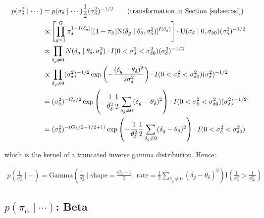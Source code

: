 \documentclass{article}\usepackage{graphicx, color}
\begin{document}
\begin{flushleft}
\begin{align*}
p(\sigma_\delta^2 \mid \cdots ) & = p(\sigma_\delta \mid \cdots) \frac{1}{2} (\sigma_\delta^2)^{-1/2} \qquad \text{(transformation in Section \ref{subsec:sd})} \\
&\propto \left [ \prod_{g = 1}^G  \pi_\delta^{1-I(\delta_g)}[(1- \pi_\delta)\text{N}(\delta_g \mid \theta_\delta, \sigma_\delta^2)]^{I(\delta_g)} \right ]  \cdot \text{U}(\sigma_\delta \mid 0, \sigma_{\delta 0})  (\sigma_\delta^2)^{-1/2} \\
&\propto \prod_{\delta_g \ne 0} N(\delta_g \mid \theta_\delta, \sigma_\delta^2) \cdot I(0 < \sigma_\delta^2 < \sigma_{\delta 0}^2 )  (\sigma_\delta^2)^{-1/2} \\
&\propto \prod_{\delta_g \ne 0} (\sigma_\delta^2)^{-1/2} \exp \left ( -\frac{(\delta_g - \theta_\delta)^2}{2 \sigma_\delta^2}\right ) \cdot I(0 < \sigma_\delta^2 < \sigma_{\delta 0}^2 )  (\sigma_\delta^2)^{-1/2} \\
&= (\sigma_\delta^2)^{-G_\delta/2} \exp \left ( -\frac{1}{\theta_\delta^2} \frac{1}{2} \sum_{\delta_g \ne 0} (\delta_g - \theta_\delta)^2 \right ) \cdot I(0 < \sigma_\delta^2 < \sigma_{\delta 0}^2 )  (\sigma_\delta^2)^{-1/2} \\
&= (\sigma_\delta^2)^{-(G_\delta/2 -1 /2 + 1)} \exp \left ( -\frac{1}{\theta_\delta^2} \frac{1}{2} \sum_{\delta_g \ne 0} (\delta_g - \theta_\delta)^2 \right ) \cdot I(0 < \sigma_\delta^2 < \sigma_{\delta 0}^2 ) \\
\end{align*}

which is the kernel of a truncated inverse gamma distribution. Hence:

\begin{align*}
p\left ( \frac{1}{\sigma_\delta^2} \mid \cdots \right ) = \text{Gamma} \left (\frac{1}{\sigma_\delta^2} \mid \text{shape} = \frac{G_\delta - 1}{2}, \ \text{rate} = \frac{1}{2} \sum_{\delta_g \ne 0} (\delta_g - \theta_\delta)^2 \right )  \text{I} \left (\frac{1}{\sigma_\delta^2} >\frac{1}{ \sigma_{\delta 0}^2} \right )
\end{align*}











\subsection{$p(\pi_\alpha \mid \cdots)$: Beta}


\end{flushleft}
\end{document}
